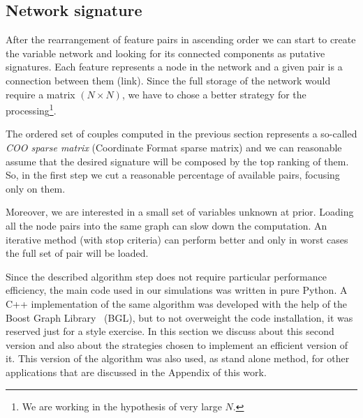 \documentclass{standalone}
\begin{document}
\subsection[Network Signature]{Network signature}\label{implementation:network}

After the rearrangement of feature pairs in ascending order we can start to create the variable network and looking for its connected components as putative signatures.
Each feature represents a node in the network and a given pair is a connection between them (link).
Since the full storage of the network would require a matrix $(N\times N)$, we have to chose a better strategy for the processing\footnote{
  We are working in the hypothesis of very large $N$.
}.

The ordered set of couples computed in the previous section represents a so-called \emph{COO sparse matrix} (Coordinate Format sparse matrix) and we can reasonable assume that the desired signature will be composed by the top ranking of them.
So, in the first step we cut a reasonable percentage of available pairs, focusing only on them.

Moreover, we are interested in a small set of variables unknown at prior.
Loading all the node pairs into the same graph can slow down the computation.
An iterative method (with stop criteria) can perform better and only in worst cases the full set of pair will be loaded.

Since the described algorithm step does not require particular performance efficiency, the main code used in our simulations was written in pure \textsf{Python}.
A \textsf{C++} implementation of the same algorithm was developed with the help of the Boost Graph Library~\cite{BGL} (BGL), but to not overweight the code installation, it was reserved just for a style exercise.
In this section we discuss about this second version and also about the strategies chosen to implement an efficient version of it.
This version of the algorithm was also used, as stand alone method, for other applications that are discussed in the Appendix of this work.
\end{document}

